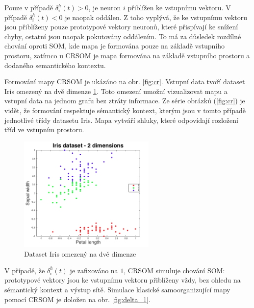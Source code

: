 \documentclass[thesis=M,czech]{FITthesis}[2012/06/26]
\begin{document}
Pouze v případě $ \delta_i^h(t) > 0 $, je neuron $i$ přiblížen ke vstupnímu vektoru. V případě $ \delta_i^h(t) < 0 $ je naopak oddálen. Z toho vyplývá, že ke vstupnímu vektoru jsou přiblíženy pouze prototypové vektory neuronů, které přispívají ke snížení chyby, ostatní jsou naopak pokutovány oddálením. To má za důsledek rozdílné chování oproti SOM, kde mapa je formována pouze na základě vstupního prostoru, zatímco u CRSOM je mapa formována na základě vstupního prostoru a dodaného semantického kontextu. 

Formování mapy CRSOM je ukázáno na obr. \ref{fig:cr}. Vstupní data tvoří dataset Iris \cite{iris} omezený na dvě dimenze \ref{fig:iris2d}. Toto omezení umožní vizualizovat mapu a vstupní data na jednom grafu bez ztráty informace. Ze série obrázků (\ref{fig:cr}) je vidět, že formování respektuje sémantický kontext, kterým jsou v tomto případě jednotlivé třídy datasetu Iris. Mapa vytváří shluky, které odpovídají rozložení tříd ve vstupním prostoru.




\begin{figure}[htp]    
    \centering
    \includegraphics[width=0.6\textwidth]{feature_space_with_classes.png}
    \caption{Dataset Iris omezený na dvě dimenze}
    \label{fig:iris2d}
\end{figure}


V případě, že $ \delta_i^h(t)$ je zafixováno na $1$, CRSOM simuluje chování SOM: prototypové vektory jsou ke vstupnímu vektoru přiblíženy vždy, bez ohledu na sémantický kontext a výstup sítě. Simulace klasické samoorganizující mapy pomocí CRSOM je doložen na obr. \ref{fig:delta_1}.
\end{document}
